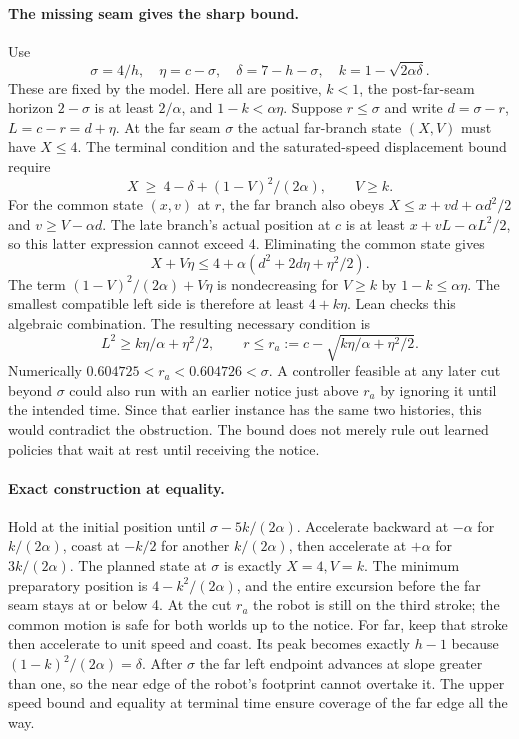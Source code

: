 \documentclass[11pt]{article}
\begin{document}
\paragraph{The missing seam gives the sharp bound.}
Use
\[
 \sigma=4/h,\quad \eta=c-\sigma,\quad
 \delta=7-h-\sigma,\quad k=1-\sqrt{2\alpha\delta}.
\]
These are fixed by the model. Here all are positive, \(k<1\),
the post-far-seam horizon \(2-\sigma\) is at least \(2/\alpha\),
and \(1-k<\alpha\eta\). Suppose \(r\le\sigma\) and write
\(d=\sigma-r\), \(L=c-r=d+\eta\). At the far seam \(\sigma\) the
actual far-branch state \((X,V)\) must have \(X\le4\).
The terminal condition and the saturated-speed displacement bound
require
\[
 X\ \ge\ 4-\delta+(1-V)^2/(2\alpha),\qquad V\ge k.
\]
For the common state \((x,v)\) at \(r\), the far branch also obeys
\(X\le x+vd+\alpha d^2/2\) and \(v\ge V-\alpha d\).
The late branch's actual position at \(c\) is at least
\(x+vL-\alpha L^2/2\), so this latter expression cannot exceed 4.
Eliminating the common state gives
\[
 X+V\eta\le4+\alpha(d^2+2d\eta+\eta^2/2).
\]
The term \((1-V)^2/(2\alpha)+V\eta\) is nondecreasing for \(V\ge k\)
by \(1-k\le\alpha\eta\). The smallest compatible left side is
therefore at least \(4+k\eta\). Lean checks this algebraic
combination. The resulting necessary condition is
\[
 L^2\ge k\eta/\alpha+\eta^2/2,\qquad
 r\le r_a:=c-\sqrt{k\eta/\alpha+\eta^2/2}.
\]
Numerically \(0.604725<r_a<0.604726<\sigma\).
A controller feasible at any later cut beyond \(\sigma\) could
also run with an earlier notice just above \(r_a\) by ignoring it
until the intended time. Since that earlier instance has the
same two histories, this would contradict the obstruction.
The bound does not merely rule out learned policies that wait
at rest until receiving the notice.

\paragraph{Exact construction at equality.}
Hold at the initial position until
\(\sigma-5k/(2\alpha)\). Accelerate backward at \(-\alpha\)
for \(k/(2\alpha)\), coast at \(-k/2\) for another \(k/(2\alpha)\),
then accelerate at \(+\alpha\) for \(3k/(2\alpha)\).
The planned state at \(\sigma\) is exactly \(X=4,V=k\).
The minimum preparatory position is \(4-k^2/(2\alpha)\),
and the entire excursion before the far seam stays at or below 4.
At the cut \(r_a\) the robot is still on the third stroke;
the common motion is safe for both worlds up to the notice.
For far, keep that stroke then accelerate to unit speed and
coast. Its peak becomes exactly \(h-1\) because
\((1-k)^2/(2\alpha)=\delta\). After \(\sigma\) the far
left endpoint advances at slope greater than one, so the
near edge of the robot's footprint cannot overtake it.
The upper speed bound and equality at terminal time ensure
coverage of the far edge all the way.
\end{document}
